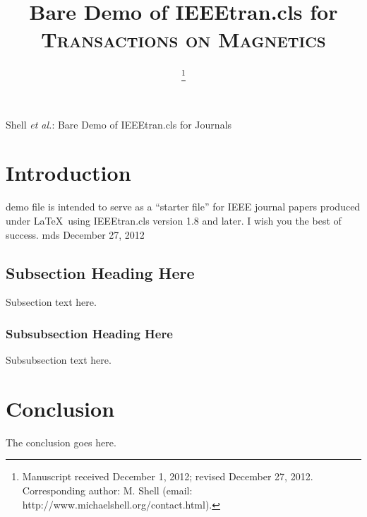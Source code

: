 \documentclass[journal,transmag]{IEEEtran}
\begin{document}
\title{Bare Demo of IEEEtran.cls for \textsc{Transactions on Magnetics}}
\author{
\thanks{Manuscript received December 1, 2012; revised December 27, 2012.
Corresponding author: M. Shell (email: http://www.michaelshell.org/contact.html).}}
%
{Shell \MakeLowercase{\textit{et al.}}: Bare Demo of IEEEtran.cls for Journals}
\maketitle
\IEEEdisplaynontitleabstractindextext
\IEEEpeerreviewmaketitle
\section{Introduction}
 demo file is intended to serve as a ``starter file''
for IEEE journal papers produced under \LaTeX\ using
IEEEtran.cls version 1.8 and later.
I wish you the best of success.
\hfill mds
\hfill December 27, 2012
\subsection{Subsection Heading Here}
Subsection text here.
\subsubsection{Subsubsection Heading Here}
Subsubsection text here.
\section{Conclusion}
The conclusion goes here.
\appendices
\end{document}
